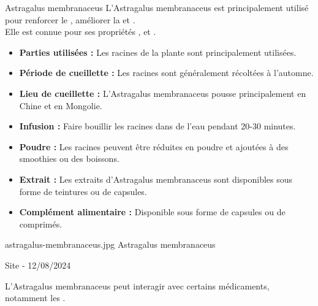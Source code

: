 \ficheidentiteplante
{Astragalus membranaceus}
{%
   L'Astragalus membranaceus est principalement utilisé pour renforcer le , améliorer la  et .\\
   Elle est connue pour ses propriétés ,  et . 
 }
{%
    \begin{itemize}[label = \bcplume]
		\item \textbf{Parties utilisées :} Les racines de la plante sont principalement utilisées.
		\item \textbf{Période de cueillette :} Les racines sont généralement récoltées à l'automne.
		\item \textbf{Lieu de cueillette :} L'Astragalus membranaceus pousse principalement en Chine et en Mongolie.
	\end{itemize}
    }

{%
   \begin{itemize}
		\item \textbf{Infusion :} Faire bouillir les racines dans de l'eau pendant 20-30 minutes.
		\item \textbf{Poudre :} Les racines peuvent être réduites en poudre et ajoutées à des smoothies ou des boissons.
		\item \textbf{Extrait :} Les extraits d'Astragalus membranaceus sont disponibles sous forme de teintures ou de capsules.
		\item \textbf{Complément alimentaire :} Disponible sous forme de capsules ou de comprimés.
\end{itemize}

}
{%
\begin{multicols}{2}


    \columnbreak


\end{multicols}
}
{%
    astragalus-membranaceus.jpg
}
{%
    Astragalus membranaceus
}
{%
    Site  - 12/08/2024 

}


\begin{Remarque}
    L'Astragalus membranaceus peut interagir avec certains médicaments, notamment les . 
\end{Remarque}